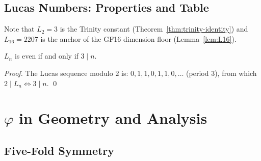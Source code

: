 \subsection{Lucas Numbers: Properties and Table}

\begin{table}[htbp]
\centering
\caption{Lucas numbers $L_n$ for $0 \leq n \leq 20$.}
\label{tab:lucas-numbers}
\end{table}

Note that $L_2 = 3$ is the Trinity constant (Theorem~\ref{thm:trinity-identity})
and $L_{16} = 2207$ is the anchor of the GF16 dimension floor
(Lemma~\ref{lem:L16}).

\begin{lemma}\label{lem:lucas-parity}
  $L_n$ is even if and only if $3 \mid n$.
\end{lemma}

\begin{proof}
  The Lucas sequence modulo $2$ is: $0,1,1,0,1,1,0,\ldots$ (period $3$),
  from which $2 \mid L_n \iff 3 \mid n$.  \qed
\end{proof}


\section{$\varphi$ in Geometry and Analysis}
\label{sec:monad-geometry}

\subsection{Five-Fold Symmetry}

